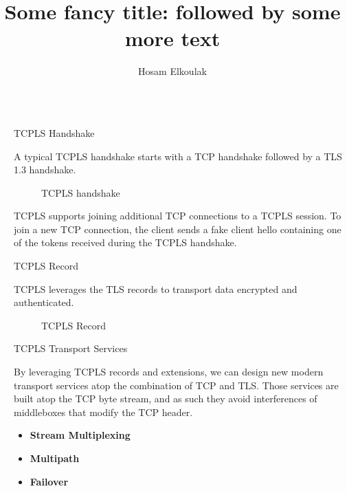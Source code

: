 \documentclass[final]{beamer}
\title{Some fancy title: followed by some more text}
\author{Hosam Elkoulak}
\institute[shortinst]{\inst{1} University of Namur}
\newlength{\sepwidth}
\newlength{\colwidth}
\newcommand{\separatorcolumn}{\begin{column}{\sepwidth}\end{column}}
\begin{document}
  \begin{frame}[t]
    \begin{columns}[t]
      \separatorcolumn

      \begin{column}{\colwidth}

        \begin{block}{TCPLS Handshake}

          A typical TCPLS handshake starts with a TCP handshake followed by a TLS 1.3 handshake.

          \begin{figure}
            \centering
            
            \caption{TCPLS handshake}
            \label{fig:tcpls-hs}
          \end{figure}

          TCPLS supports joining additional TCP connections to a TCPLS session.
          To join a new TCP connection, the client sends a fake client hello
          containing one of the tokens received during the TCPLS handshake.

        \end{block}

        \begin{block}{TCPLS Record}

          TCPLS leverages the TLS records to transport data encrypted and authenticated.

          \begin{figure}
            \centering
            
            \caption{TCPLS Record}
            \label{fig:tcpls-record}
          \end{figure}


        \end{block}
        \begin{block}{TCPLS Transport Services}

          By leveraging TCPLS records and extensions, we can design new
          modern transport services atop the combination of TCP and TLS. Those services are built atop the TCP
          byte stream, and as such they avoid interferences of middleboxes that modify the TCP header.

          \begin{itemize}
            \item \textbf{Stream Multiplexing}
            \item \textbf{Multipath}
            \item \textbf{Failover}
          \end{itemize}
        \end{block}
        \begin{figure}
          \centering
          
          \label{fig:unamur}
        \end{figure}
        \begin{figure}
          \centering
          
          \label{fig:cyberwal}
        \end{figure}


\end{column}
\end{columns}
\end{frame}
\end{document}
